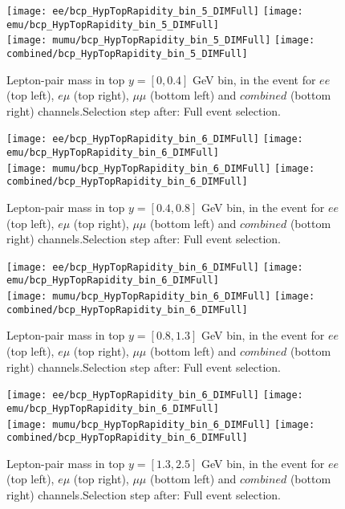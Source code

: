 \documentclass[12pt, a4paper, titlepage]{article}
\begin{document}
\begin{figure}
  \texttt{[image: ee/bcp\_HypTopRapidity\_bin\_5\_DIMFull]}
  \texttt{[image: emu/bcp\_HypTopRapidity\_bin\_5\_DIMFull]}\\
  \texttt{[image: mumu/bcp\_HypTopRapidity\_bin\_5\_DIMFull]}
  \texttt{[image: combined/bcp\_HypTopRapidity\_bin\_5\_DIMFull]}
\caption{Lepton-pair mass in top $y = [0,0.4]$ GeV bin, in the event for $ee$ (top left), $e\mu$ (top right), $\mu\mu$ (bottom left) and $combined$ (bottom right) channels.\newline Selection step after: Full event selection.}
\end{figure}

\clearpage
\newpage

\begin{figure}
  \texttt{[image: ee/bcp\_HypTopRapidity\_bin\_6\_DIMFull]}
  \texttt{[image: emu/bcp\_HypTopRapidity\_bin\_6\_DIMFull]}\\
  \texttt{[image: mumu/bcp\_HypTopRapidity\_bin\_6\_DIMFull]}
  \texttt{[image: combined/bcp\_HypTopRapidity\_bin\_6\_DIMFull]}
\caption{Lepton-pair mass in top $y = [0.4,0.8]$ GeV bin, in the event for $ee$ (top left), $e\mu$ (top right), $\mu\mu$ (bottom left) and $combined$ (bottom right) channels.\newline Selection step after: Full event selection.}
\end{figure}

\clearpage
\newpage
\begin{figure}
  \texttt{[image: ee/bcp\_HypTopRapidity\_bin\_6\_DIMFull]}
  \texttt{[image: emu/bcp\_HypTopRapidity\_bin\_6\_DIMFull]}\\
  \texttt{[image: mumu/bcp\_HypTopRapidity\_bin\_6\_DIMFull]}
  \texttt{[image: combined/bcp\_HypTopRapidity\_bin\_6\_DIMFull]}
\caption{Lepton-pair mass in top $y = [0.8,1.3]$ GeV bin, in the event for $ee$ (top left), $e\mu$ (top right), $\mu\mu$ (bottom left) and $combined$ (bottom right) channels.\newline Selection step after: Full event selection.}
\end{figure}

\clearpage
\newpage
\begin{figure}
  \texttt{[image: ee/bcp\_HypTopRapidity\_bin\_6\_DIMFull]}
  \texttt{[image: emu/bcp\_HypTopRapidity\_bin\_6\_DIMFull]}\\
  \texttt{[image: mumu/bcp\_HypTopRapidity\_bin\_6\_DIMFull]}
  \texttt{[image: combined/bcp\_HypTopRapidity\_bin\_6\_DIMFull]}
\caption{Lepton-pair mass in top $y = [1.3,2.5]$ GeV bin, in the event for $ee$ (top left), $e\mu$ (top right), $\mu\mu$ (bottom left) and $combined$ (bottom right) channels.\newline Selection step after: Full event selection.}
\end{figure}
\end{document}
